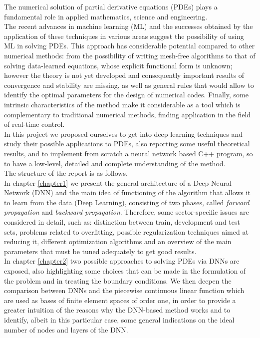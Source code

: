 \documentclass[12pt, a4paper]{report}
\theoremstyle{definition}
\begin{document}
The numerical solution of partial derivative equations (PDEs) plays a fundamental role in applied mathematics, science and engineering. \\
The recent advances in machine learning (ML) and the successes obtained by the application of these techniques in various areas suggest the possibility of using ML in solving PDEs. This approach has considerable potential compared to other numerical methods: from the possibility of writing mesh-free algorithms to that of solving data-learned equations, whose explicit functional form is unknown; however the theory is not yet developed and consequently important results of convergence and stability are missing, as well as general rules that would allow to identify the optimal parameters for the design of numerical codes. Finally, some intrinsic characteristics of the method make it considerable as a  tool which is complementary to traditional numerical methods, finding application in the field of real-time control. \\
In this project we proposed ourselves to get into deep learning techniques and study their  possible applications to PDEs, also reporting some useful theoretical results, and to implement from scratch a neural network based C++ program, so to have a low-level, detailed and complete understanding of the method.
\\The structure of the report is as follows.\\
In chapter \ref{chapter1} we present the general architecture of a Deep Neural Network (DNN) and the main idea of functioning of the algorithm that allows it to learn from the data (Deep Learning), consisting of two phases, called \textit{forward propagation} and \textit{backward propagation}. Therefore, some  sector-specific issues are considered in detail, such as: distinction between train, development and test sets, problems related to overfitting, possible regularization techniques aimed at reducing it, different optimization algorithms and an overview of the main parameters that must be tuned adequately to get good results.\\
In chapter \ref{chapter2} two possible approaches to solving PDEs via DNNs are exposed, also highlighting some choices that can be made in the formulation of the problem and in treating the boundary conditions. We then deepen the comparison between DNNs and the piecewise continuous linear function which are used as bases of finite element spaces of order one, in order to provide a greater intuition of the reasons why the DNN-based method works and to identify, albeit in this particular case, some general indications on the ideal number of nodes and layers of the DNN.\\
\end{document}
